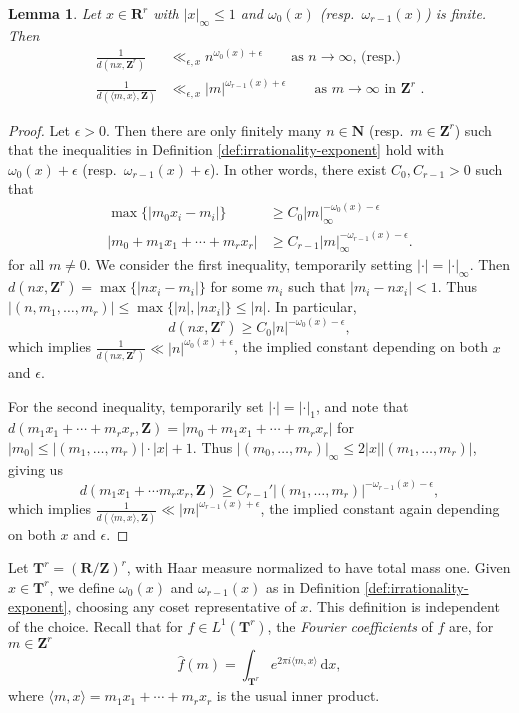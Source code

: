 \documentclass{article}
\newcommand{\bN}{\mathbf{N}}
\newcommand{\bR}{\mathbf{R}}
\newcommand{\bT}{\mathbf{T}}
\newcommand{\bZ}{\mathbf{Z}}
\newcommand{\dd}{\mathrm{d}}
\newtheorem{lemma}[subsection]{Lemma}
\theoremstyle{definition}
\begin{document}
\begin{lemma}\label{lem:distance-asymptotic}
Let $x\in \bR^r$ with $|x|_\infty\leqslant 1$ and $\omega_0(x)$
(resp.~$\omega_{r-1}(x)$) is finite. Then 
\begin{align*}
	\frac{1}{d(n x,\bZ^r)} &\ll_{\epsilon,x} n^{\omega_0(x)+\epsilon} \qquad \text{as $n\to \infty$, (resp.)}\\
	\frac{1}{d(\langle m,x\rangle,\bZ)} &\ll_{\epsilon,x} |m|^{\omega_{r-1}(x)+\epsilon}\qquad \text{as $m\to \infty$ in $\bZ^r$ .}
\end{align*}
\end{lemma}
\begin{proof}
Let $\epsilon>0$. Then there are only finitely many $n\in \bN$ 
(resp.~$m\in \bZ^r$) such that the inequalities in 
Definition \ref{def:irrationality-exponent} hold with $\omega_0(x)+\epsilon$ 
(resp.~$\omega_{r-1}(x)+\epsilon$). In other words, there exist 
$C_0,C_{r-1}>0$ such that 
\begin{align*}
	\max\{|m_0 x_i - m_i|\} &\geqslant C_0 |m|_\infty^{-\omega_0(x)-\epsilon} \\
	|m_0 + m_1 x_1 + \cdots + m_r x_r| &\geqslant C_{r-1} |m|_\infty^{-\omega_{r-1}(x)-\epsilon} .
\end{align*}
for all $m\ne 0$. We consider the first inequality, temporarily setting 
$|\cdot|=|\cdot|_\infty$. Then $d(n x,\bZ^r)=\max\{|n x_i-m_i|\}$ for some 
$m_i$ such that $|m_i-n x_i|< 1$. Thus 
$|(n,m_1,\dots,m_r)| \leqslant \max\{|n|,|n x_i|\}\leqslant |n|$. In 
particular, 
\[
	d(nx,\bZ^r) \geqslant C_0 |n|^{-\omega_0(x)-\epsilon} ,
\]
which implies $\frac{1}{d(n x,\bZ^r)} \ll |n|^{\omega_0(x)+\epsilon}$, the 
implied constant depending on both $x$ and $\epsilon$. 

For the second inequality, temporarily set $|\cdot|=|\cdot|_1$, and note that 
$d(m_1 x_1+\cdots+m_r x_r,\bZ)=|m_0+m_1 x_1+\cdots + m_r x_r|$ for 
$|m_0| \leqslant |(m_1,\dots,m_r)|\cdot |x|+1$. Thus 
$|(m_0,\dots,m_r)|_\infty \leqslant 2 |x| |(m_1,\dots,m_r)|$, giving us 
\[
	d(m_1x_1 + \cdots m_r x_r,\bZ) \geqslant C_{r-1}' |(m_1,\dots,m_r)|^{-\omega_{r-1}(x)-\epsilon} ,
\]
which implies $\frac{1}{d(\langle m,x\rangle,\bZ)} \ll |m|^{\omega_{r-1}(x)+\epsilon}$, 
the implied constant again depending on both $x$ and $\epsilon$. 
\end{proof}

Let $\bT^r=(\bR/\bZ)^r$, with Haar measure normalized to have total mass one. 
Given $x\in \bT^r$, we define $\omega_0(x)$ and $\omega_{r-1}(x)$ as in 
Definition \ref{def:irrationality-exponent}, choosing any coset representative of $x$. 
This definition is independent of the choice. Recall that for 
$f\in L^1(\bT^r)$, the \emph{Fourier coefficients} of $f$ are, for $m\in \bZ^r$ 
\[
	\widehat f(m) = \int_{\bT^r} e^{2\pi i \langle m,x\rangle}\, \dd x ,
\]
where $\langle m,x\rangle=m_1 x_1 + \cdots + m_r x_r$ is the usual inner 
product. 
\end{document}
